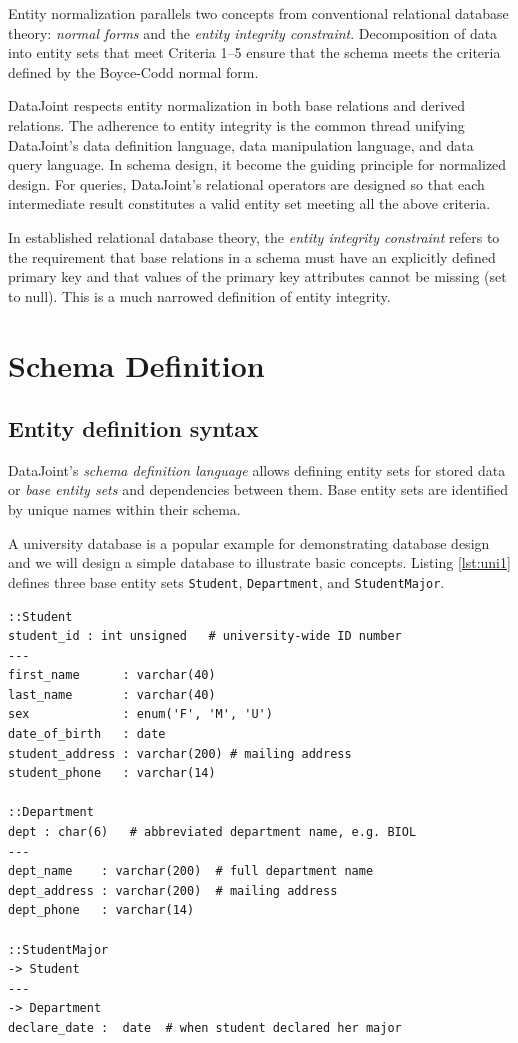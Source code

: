 \documentclass[letter,10pt]{article}
\newcommand{\datajoint}{DataJoint\xspace}
\begin{document}
Entity normalization parallels two concepts from conventional relational database theory: \emph{normal forms} and the \emph{entity integrity constraint}.
Decomposition  of data into entity sets that meet Criteria 1--5 ensure that the schema meets the criteria defined by the Boyce-Codd normal form.
 
\datajoint respects entity normalization in both base relations and derived relations.  
The adherence to entity integrity is the common thread unifying \datajoint's data definition language, data manipulation language, and data query language. 
In schema design, it become the guiding principle for normalized design.
For queries, \datajoint's relational operators are designed so that each intermediate result constitutes a valid entity set meeting all the above criteria.

In established relational database theory, the \emph{entity integrity constraint} refers to the requirement that base relations in a schema  must have an explicitly defined primary key and that values of the primary key attributes cannot be missing (set to null).  
This is a much narrowed definition of entity integrity.

\section{Schema Definition}\label{sec:def1}
\subsection{Entity definition syntax}
\datajoint's  \emph{schema definition language} allows defining entity sets for stored data or \emph{base entity sets} and dependencies between them. 
Base entity sets are identified by unique names within their schema. 

A university database is a popular example for demonstrating database design and we will design a simple database to illustrate basic concepts. 
Listing \ref{lst:uni1} defines three base entity sets {\tt Student}, {\tt Department}, and {\tt StudentMajor}.

\begin{lstfloat*}
\begin{lstlisting}[language=dj,caption={University database schema definition (Part 1).},label={lst:uni1}]
::Student     
student_id : int unsigned   # university-wide ID number 
---
first_name      : varchar(40)
last_name       : varchar(40)
sex             : enum('F', 'M', 'U')
date_of_birth   : date
student_address : varchar(200) # mailing address
student_phone   : varchar(14) 

::Department 
dept : char(6)   # abbreviated department name, e.g. BIOL
---
dept_name    : varchar(200)  # full department name
dept_address : varchar(200)  # mailing address
dept_phone   : varchar(14)  

::StudentMajor
-> Student
---
-> Department
declare_date :  date  # when student declared her major  
\end{lstlisting}
\end{lstfloat*}
\end{document}
